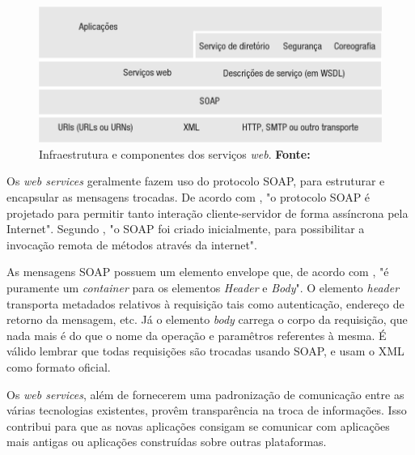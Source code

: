 \begin{figure}[h!]
	\centerline{\includegraphics[scale=0.7]{./imagens/1_q_teorico/qt2.png}}
	\caption[Infraestrutura e componentes dos serviços
		\textit{web}. ]{Infraestrutura e componentes dos serviços
		\textit{web}. \textbf{Fonte:}}
	\label{fig:ws}
\end{figure}
	
	\par Os \textit{web services} geralmente fazem uso do protocolo SOAP, para
estruturar e encapsular as mensagens trocadas. De acordo com
, "o protocolo SOAP é projetado para permitir
tanto interação cliente-servidor de forma assíncrona pela Internet". Segundo
, "o SOAP foi criado inicialmente, para
possibilitar a invocação remota de métodos através da internet".

	\par As mensagens SOAP possuem um elemento envelope que, de acordo com
, "é puramente um \textit{container} para os
elementos \textit{Header} e \textit{Body}". O elemento \textit{header}
transporta metadados relativos à requisição tais como autenticação, endereço de
retorno da mensagem, etc. Já o elemento \textit{body} carrega o corpo da
requisição, que nada mais é do que o nome da operação e paramêtros referentes à
mesma. É válido lembrar que todas requisições são trocadas usando SOAP, e usam
o XML como formato oficial. 
	

	\par Os \textit{web services}, além de fornecerem uma padronização de
comunicação entre as várias tecnologias existentes, provêm transparência na
troca de informações. Isso contribui para que as novas aplicações consigam se
comunicar com aplicações mais antigas ou aplicações construídas sobre outras
plataformas.

